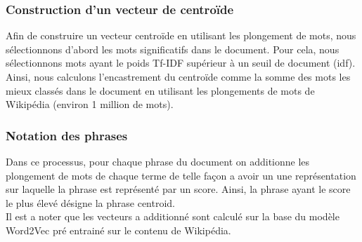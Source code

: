 


\subsubsection{Construction d'un vecteur de centroïde}
Afin de construire un vecteur centroïde en utilisant les plongement de mots, nous sélectionnons d'abord les mots significatifs dans le document. Pour cela, nous sélectionnons mots ayant le poids Tf-IDF supérieur à un seuil de document (idf). Ainsi, nous calculons l'encastrement du centroïde comme la somme des mots les mieux classés dans le document en utilisant les plongements de mots de Wikipédia (environ 1 million de mots). 



\subsubsection{Notation des phrases}
Dans ce processus, pour chaque phrase du document on additionne les plongement de mots de chaque terme de telle façon a avoir un une représentation sur laquelle la phrase est représenté par un score. Ainsi, la phrase ayant le score le plus élevé désigne la phrase centroid.\\
Il est a noter que les vecteurs a additionné sont calculé sur la base du modèle Word2Vec pré entrainé sur le contenu de Wikipédia.

